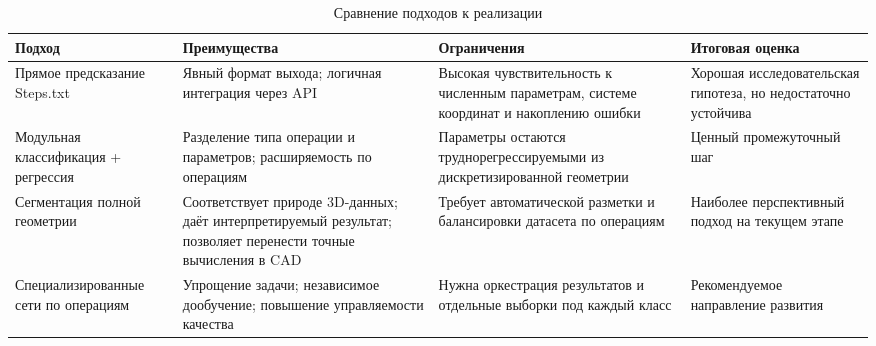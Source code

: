 \begin{table}[h]
\centering
\caption{Сравнение подходов к реализации}
\label{tab:approach-comparison}
\begin{tabular}{|p{4cm}|p{4cm}|p{4cm}|p{3.5cm}|}
\hline
\textbf{Подход} & \textbf{Преимущества} & \textbf{Ограничения} & \textbf{Итоговая оценка} \\
\hline
Прямое предсказание Steps.txt & Явный формат выхода; логичная интеграция через API & Высокая чувствительность к численным параметрам, системе координат и накоплению ошибки & Хорошая исследовательская гипотеза, но недостаточно устойчива \\
\hline
Модульная классификация + регрессия & Разделение типа операции и параметров; расширяемость по операциям & Параметры остаются труднорегрессируемыми из дискретизированной геометрии & Ценный промежуточный шаг \\
\hline
Сегментация полной геометрии & Соответствует природе 3D-данных; даёт интерпретируемый результат; позволяет перенести точные вычисления в CAD & Требует автоматической разметки и балансировки датасета по операциям & Наиболее перспективный подход на текущем этапе \\
\hline
Специализированные сети по операциям & Упрощение задачи; независимое дообучение; повышение управляемости качества & Нужна оркестрация результатов и отдельные выборки под каждый класс & Рекомендуемое направление развития \\
\hline
\end{tabular}
\end{table}

